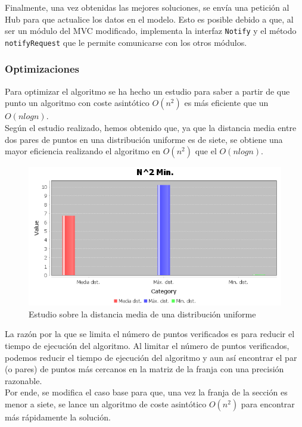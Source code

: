 Finalmente, una vez obtenidas las mejores soluciones, se envía una petición al Hub para que actualice los datos en el modelo. Esto es posible debido a que, al ser un módulo del MVC modificado, implementa la interfaz \texttt{Notify} y el método \texttt{notifyRequest} que le permite comunicarse con los otros módulos.

\subsubsection{Optimizaciones}
Para optimizar el algoritmo se ha hecho un estudio para saber a partir de que punto un algoritmo con coste asintótico $O(n^2)$ es más eficiente que un $O(nlogn)$.\\

Según el estudio realizado, hemos obtenido que, ya que la distancia media entre dos pares de puntos en una distribución uniforme es de siete, se obtiene una mayor eficiencia realizando el algoritmo en $O(n^2)$ que el $O(nlogn)$.\\

\begin{figure}[!h]
    \centering
    \includegraphics[width=\linewidth]{MVC/Controller/img/study_mean_distance.png}
    \caption{Estudio sobre la distancia media de una distribución uniforme}
    \label{fig:study}
\end{figure}

La razón por la que se limita el número de puntos verificados es para reducir el tiempo de ejecución del algoritmo. Al limitar el número de puntos verificados, podemos reducir el tiempo de ejecución del algoritmo y aun así encontrar el par (o pares) de puntos más cercanos en la matriz de la franja con una precisión razonable.\\

Por ende, se modifica el caso base para que, una vez la franja de la sección es menor a siete, se lance un algoritmo de coste asintótico $O(n^2)$ para encontrar más rápidamente la solución.
